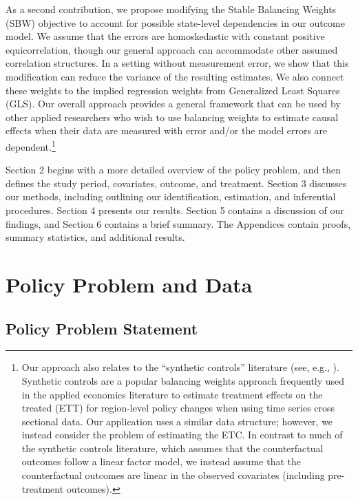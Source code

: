 \documentclass[aoas]{imsart}
\theoremstyle{plain}
\theoremstyle{remark}
\begin{document}
As a second contribution, we propose modifying the Stable Balancing Weights (SBW) objective \citep{zubizarreta2015stable} to account for possible state-level dependencies in our outcome model. We assume that the errors are homoskedastic with constant positive equicorrelation, though our general approach can accommodate other assumed correlation structures. In a setting without measurement error, we show that this modification can reduce the variance of the resulting estimates. We also connect these weights to the implied regression weights from Generalized Least Squares (GLS). Our overall approach provides a general framework that can be used by other applied researchers who wish to use balancing weights to estimate causal effects when their data are measured with error and/or the model errors are dependent.\footnote{Our approach also relates to the ``synthetic controls'' literature (see, e.g., \citet{abadie2010synthetic}). Synthetic controls are a popular balancing weights approach frequently used in the applied economics literature to estimate treatment effects on the treated (ETT) for region-level policy changes when using time series cross sectional data. Our application uses a similar data structure; however, we instead consider the problem of estimating the ETC. In contrast to much of the synthetic controls literature, which assumes that the counterfactual outcomes follow a linear factor model, we instead assume that the counterfactual outcomes are linear in the observed covariates (including pre-treatment outcomes).}

Section 2 begins with a more detailed overview of the policy problem, and then defines the study period, covariates, outcome, and treatment. Section 3 discusses our methods, including outlining our identification, estimation, and inferential procedures. Section 4 presents our results. Section 5 contains a discussion of our findings, and Section 6 contains a brief summary. The Appendices contain proofs, summary statistics, and additional results.

\section{Policy Problem and Data}

\subsection{Policy Problem Statement}
\end{document}
